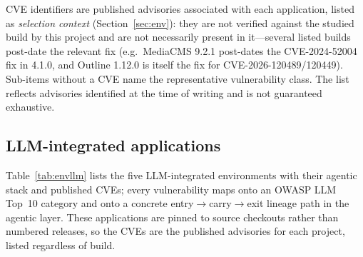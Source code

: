 \documentclass[11pt,a4paper]{article}
\begin{document}
\begin{table}[htbp]
{\footnotesize CVE identifiers are published advisories associated with each application,
listed as \emph{selection context} (Section~\ref{sec:env}): they are not verified against the
studied build by this project and are not necessarily present in it---several listed builds
post-date the relevant fix (e.g.\ MediaCMS 9.2.1 post-dates the CVE-2024-52004 fix in 4.1.0,
and Outline 1.12.0 is itself the fix for CVE-2026-120489/120449). Sub-items without a CVE name
the representative vulnerability class. The list reflects advisories identified at the time of
writing and is not guaranteed exhaustive.}
\end{table}

\subsection{LLM-integrated applications}
Table~\ref{tab:envllm} lists the five LLM-integrated environments with their agentic
stack and published CVEs; every vulnerability maps onto an OWASP LLM Top~10 category and
onto a concrete entry$\to$carry$\to$exit lineage path in the agentic layer. These
applications are pinned to source checkouts rather than numbered releases, so the CVEs are
the published advisories for each project, listed regardless of build.
\end{document}
